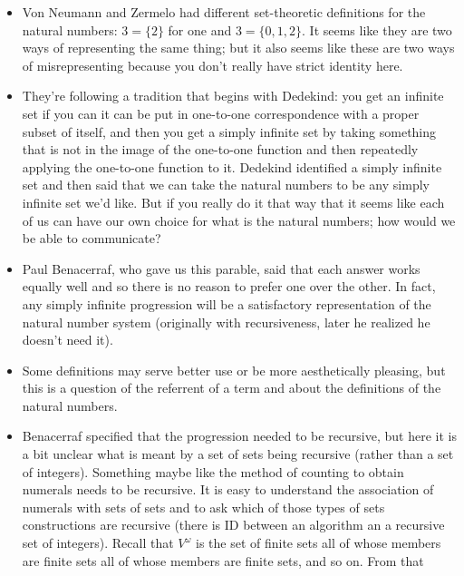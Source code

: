 \documentclass[12pt]{article}
\theoremstyle{definition}
\begin{document}
\begin{itemize}
    \itemsep0em 
    \item 
        Von Neumann and Zermelo had different set-theoretic definitions for the
        natural numbers: $3 = \{2\}$ for one and $3 = \{0,1,2\}$. It seems like
        they are two ways of representing the same thing; but it also seems
        like these are two ways of misrepresenting because you don't really
        have strict identity here.
    \item
        They're following a tradition that begins with Dedekind: you get an
        infinite set if you can it can be put in one-to-one correspondence with
        a proper subset of itself, and then you get a simply infinite set by
        taking something that is not in the image of the one-to-one function
        and then repeatedly applying the one-to-one function to it. Dedekind
        identified a simply infinite set and then said that we can take the
        natural numbers to be any simply infinite set we'd like. But if you
        really do it that way that it seems like each of us can have our own
        choice for what is the natural numbers; how would we be able to
        communicate? 
    \item
        Paul Benacerraf, who gave us this parable, said that each answer works
        equally well and so there is no reason to prefer one over the other. In
        fact, any simply infinite progression will be a satisfactory
        representation of the natural number system (originally with
        recursiveness, later he realized he doesn't need it). 
    \item
        Some definitions may serve better use or be more aesthetically
        pleasing, but this is a question of the referrent of a term and about
        the definitions of the natural numbers.
    \item
        Benacerraf specified that the progression needed to be recursive, but
        here it is a bit unclear what is meant by a set of sets being recursive
        (rather than a set of integers). Something maybe like the method of
        counting to obtain numerals needs to be recursive. It is easy to
        understand the association of numerals with sets of sets and to ask
        which of those types of sets constructions are recursive (there is ID
        between an algorithm an a recursive set of integers). Recall that
        $V^\omega$ is the set of finite sets all of whose members are finite
        sets all of whose members are finite sets, and so on. From that

\end{itemize}
\end{document}
